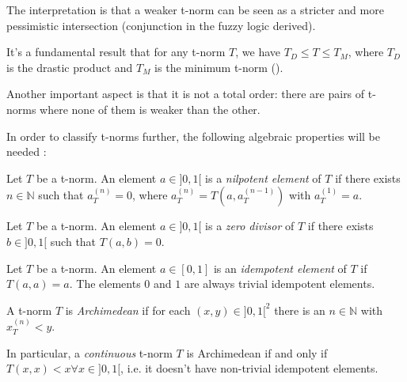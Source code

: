The interpretation is that a weaker t-norm can be seen as a stricter and more pessimistic intersection (conjunction in the fuzzy logic derived).

It's a fundamental result that for any t-norm $T$, we have $T_D \leq T \leq T_M$, where $T_D$ is the drastic product and $T_M$ is the minimum t-norm  (\cite[Rem.~1.5]{Klement2000}).

Another important aspect is that it is not a total order: there are pairs of t-norms where none of them is weaker than the other. 



In order to classify t-norms further, the following algebraic properties will be needed \cite[Def.~2.1]{Klement2000}:

\begin{definition}
Let $T$ be a t-norm. An element $a \in ]0,1[$ is a \emph{nilpotent element} of $T$ if there exists $n \in \mathbb{N}$ such that $a_T^{(n)} = 0$, where $a_T^{(n)} = T(a, a_T^{(n-1)})$ with $a_T^{(1)}=a$.
\end{definition}

\begin{definition}
Let $T$ be a t-norm. An element $a \in ]0,1[$ is a \emph{zero divisor} of $T$ if there exists $b \in ]0,1[$ such that $T(a,b)=0$.
\end{definition}

\begin{definition}
  Let $T$ be a t-norm. An element $a \in [0,1]$ is an \emph{idempotent element} of $T$ if $T(a,a)=a$. The elements $0$ and $1$ are always trivial idempotent elements.
  \end{definition}
  

\begin{definition}
A t-norm $T$ is \emph{Archimedean} if for each $(x,y) \in ]0,1[^2$ there is an $n \in \mathbb{N}$ with $x_T^{(n)} < y$. \cite[Def.~2.9]{Klement2000}  

In particular, a \textit{continuous} t-norm $T$ is Archimedean if and only if $T(x,x) < x \forall x \in ]0,1[$, i.e. it doesn't have non-trivial idempotent elements. \cite[Thm.~2.12]{Klement2000}
\end{definition}

